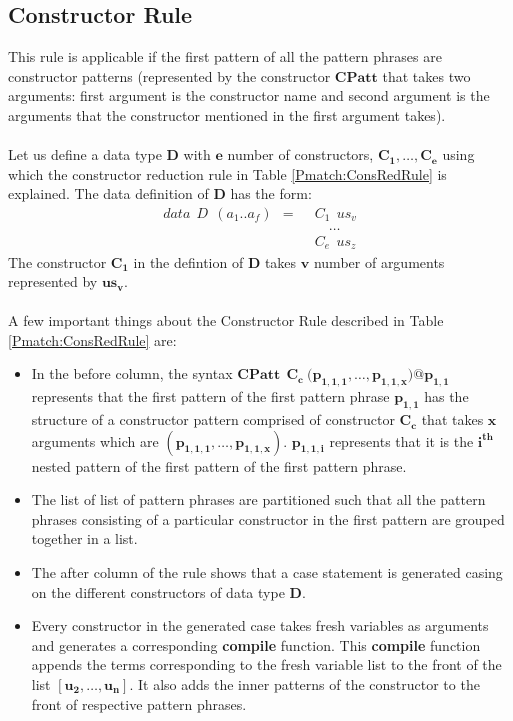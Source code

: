 \documentclass[11pt]{article}
\begin{document}
\subsection {Constructor Rule}
This rule is applicable if the first pattern of all the pattern phrases are constructor patterns (represented by the constructor $\mathbf{CPatt}$ that takes two arguments: first argument is the constructor name and second argument is the arguments that the constructor mentioned in the first argument takes).
~~\\~~\\
Let us define a data type $\mathbf{D}$ with $\mathbf{e}$ number of constructors, $\mathbf{C_1,\ldots,C_e}$ using which the constructor reduction rule in Table \ref {Pmatch:ConsRedRule} is explained. The data definition of $\mathbf{D}$ has the form:
\begin{align*}
  data~~D~~(a_1..a_f)~~=~~& C_1~~us_v \\  
                          & \quad \ldots \\
                          & C_e~~us_z
\end{align*}
The constructor $\mathbf{C_1}$ in the defintion of $\mathbf{D}$ takes $\mathbf{v}$ number of arguments represented by $\mathbf{us_v }$. 
~~\\~~\\
A few important things about the Constructor Rule described in Table \ref {Pmatch:ConsRedRule} are:  
\begin{itemize}
  \item In the before column, the syntax $\mathbf{CPatt~~C_c~\big(p_{1,1,1},\ldots,p_{1,1,x}\big)@p_{1,1}}$ represents that the first pattern of the first pattern phrase $\mathbf{p_{1,1}}$ has the structure of a constructor pattern comprised of constructor $\mathbf{C_c}$ that takes $\mathbf{x}$ arguments which are $\mathbf{(p_{1,1,1},\ldots,p_{1,1,x})}$. $\mathbf{p_{1,1,i}}$ represents that it is the $\mathbf{i^{th}}$ nested pattern of the first pattern of the first pattern phrase. 
  \item The list of list of pattern phrases are partitioned such that all the pattern phrases consisting of a particular constructor in the first pattern are grouped together in a list.
  \item The after column of the rule shows that a {\sf case} statement is generated casing on the different constructors of data type $\mathbf{D}$.
  \item Every constructor in the generated {\sf case} takes fresh variables as arguments and generates a corresponding {\bf compile} function. This {\bf compile} function appends the terms corresponding to the fresh variable list to the front of the list $\mathbf{[u_2,\ldots,u_n]}$. It also adds the inner patterns of the constructor to the front of respective pattern phrases. 
\end{itemize}
\end{document}
